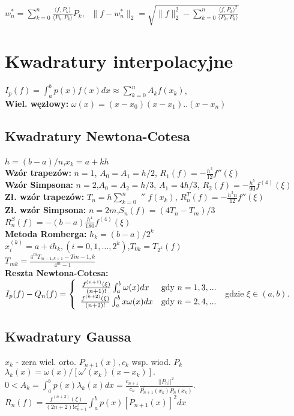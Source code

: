 \documentclass[a4paper,twocolumn]{article}
\begin{document}
$w_n^* = \sum_{k=0}^n \frac{\langle f, P_k \rangle}{\langle P_k, P_k \rangle} P_k,\;$
$\|f-w_n^*\|_2 = \sqrt{\|f\|_2^2 - \sum_{k=0}^n \frac{{\langle f, P_k \rangle}^2}{\langle P_k, P_k \rangle}}$

\section{Kwadratury interpolacyjne}
\noindent $I_p(f) = \int_{a}^{b}p(x)f(x)dx \approx \sum_{k=0}^{n}A_kf(x_k)$, \\
\textbf{Wiel. węzłowy:} $\omega(x) = (x-x_0)(x-x_1)..(x-x_n)$

\subsection{Kwadratury Newtona-Cotesa}
$h=(b-a)/n$,\quad $x_k=a+kh$\\
\textbf{Wzór trapezów:}  $n=1$, $A_0=A_1=h/2$, $R_1(f)=-\frac{h^3}{12}f''(\xi)$\\
\textbf{Wzór Simpsona:} $n=2$,$A_0=A_2=h/3$, $A_1=4h/3$, $R_2(f)=-\frac{h^5}{90}f^{(4)}(\xi)$\\
\textbf{Zł. wzór trapezów:} $T_n=h\sum_{k=0}^{n}$ $''$ $f(x_k)$,
$R_n^T(f)=-\frac{h^3n}{12}f''(\xi)$\\
\textbf{Zł. wzór Simpsona:} $n=2m$,\quad $S_n(f)=(4T_n-T_m)/3$\\
$R_n^S(f)=-(b-a)\frac{h^4}{180}f^{(4)}(\xi)$\\
\textbf{Metoda Romberga:} $h_k=(b-a)/2^k$\\
$x_i^(k)=a+ih_k,(i=0,1,\dots,2^k)$,\quad $T_{0k}=T_{2^k}(f)$\\
$T_{mk}=\frac{4^mT_{m-1,k+1} - T{m-1,k}}{4^m-1}$\\
\textbf{Reszta Newtona-Cotesa:} \\
\noindent$  I_p(f) - Q_n(f) = \left\{ \begin{array}{ll}
\left.\frac{f^{(n+1)}(\xi)}{(n+1)!}\int_{a}^{b} \omega(x) dx
\right. & \textrm{gdy $ n = 1,3,... $}\\
\frac{f^{(n+2)}(\xi)}{(n+2)!}\int_{a}^{b} x\omega(x) dx & \textrm{gdy $ n = 2,4,... $}
\end{array} \right.
$
gdzie $\xi \in (a, b).$
\subsection{Kwadratury Gaussa}
\noindent$x_k$ - zera wiel. orto. $P_{n+1}(x), c_k $ wsp. wiod. $P_k$\\
$\lambda_k(x) = \omega(x) / [\omega'(x_k)(x-x_k)]. $ \\
$0 < A_k=\int_{a}^{b}p(x)\lambda_k(x) dx = \frac{c_{n+1}}{c_n} \frac{||P_n||^2}{P_{n+1}^{'}(x_k)P_n(x_k)}$.  \\
$R_n(f)=\frac{f^{(n+2)}(\xi)}{(2n+2)!c_{n+1}^{2} }\int_a^bp(x)[P_{n+1}(x)]^2 dx $
\end{document}
